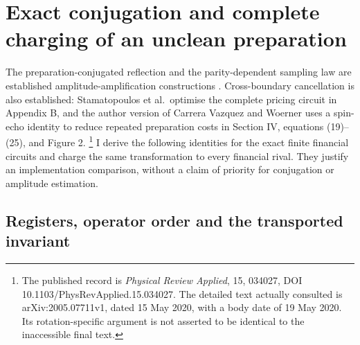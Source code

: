 \documentclass[11pt]{article}
\begin{document}
\section{Exact conjugation and complete charging of an unclean preparation}
\label{app:cancellation-aware-preparation}

The preparation-conjugated reflection and the parity-dependent sampling
law are established amplitude-amplification constructions
\citep{suzuki2020,rallfuller2023}. Cross-boundary cancellation is also
established: Stamatopoulos et al.\ optimise the complete pricing circuit
in Appendix B, and the author version of Carrera Vazquez and Woerner
uses a spin-echo identity to reduce repeated preparation costs in
Section IV, equations (19)--(25), and Figure 2.
\footnote{The published record is \emph{Physical Review Applied}, 15,
034027, DOI 10.1103/PhysRevApplied.15.034027. The detailed text actually
consulted is arXiv:2005.07711v1, dated 15 May 2020, with a body date of
19 May 2020. Its rotation-specific argument is not asserted to be
identical to the inaccessible final text.}
I derive the following identities for the exact finite financial
circuits and charge the same transformation to every financial rival.
They justify an implementation comparison, without a claim of priority
for conjugation or amplitude estimation.

\subsection{Registers, operator order and the transported invariant}
\end{document}
